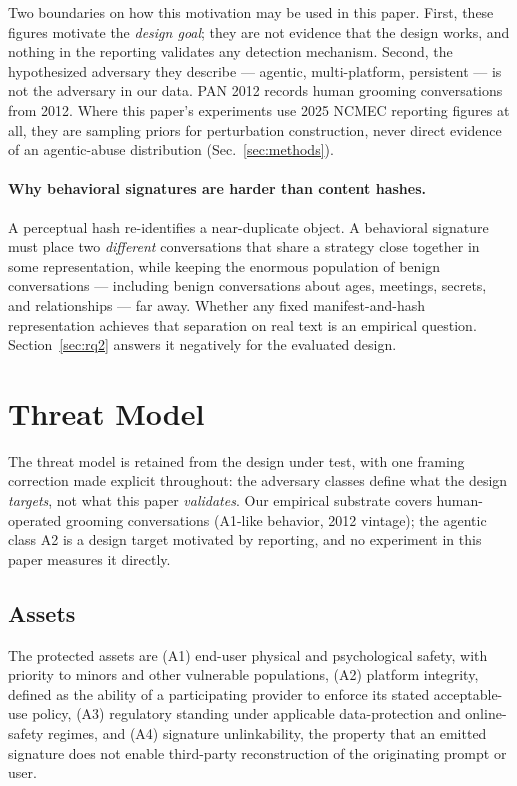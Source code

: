 \documentclass[11pt]{article}
\begin{document}
Two boundaries on how this motivation may be used in this paper. First, these figures motivate the \emph{design goal}; they are not evidence that the design works, and nothing in the reporting validates any detection mechanism. Second, the hypothesized adversary they describe --- agentic, multi-platform, persistent --- is not the adversary in our data. PAN 2012 records human grooming conversations from 2012. Where this paper's experiments use 2025 NCMEC reporting figures at all, they are sampling priors for perturbation construction, never direct evidence of an agentic-abuse distribution (Sec.~\ref{sec:methods}).

\paragraph{Why behavioral signatures are harder than content hashes.}
A perceptual hash re-identifies a near-duplicate object. A behavioral signature must place two \emph{different} conversations that share a strategy close together in some representation, while keeping the enormous population of benign conversations --- including benign conversations about ages, meetings, secrets, and relationships --- far away. Whether any fixed manifest-and-hash representation achieves that separation on real text is an empirical question. Section~\ref{sec:rq2} answers it negatively for the evaluated design.

\section{Threat Model}
\label{sec:threat}

The threat model is retained from the design under test, with one framing correction made explicit throughout: the adversary classes define what the design \emph{targets}, not what this paper \emph{validates}. Our empirical substrate covers human-operated grooming conversations (A1-like behavior, 2012 vintage); the agentic class A2 is a design target motivated by reporting, and no experiment in this paper measures it directly.

\subsection{Assets}
The protected assets are (A1) end-user physical and psychological safety, with priority to minors and other vulnerable populations, (A2) platform integrity, defined as the ability of a participating provider to enforce its stated acceptable-use policy, (A3) regulatory standing under applicable data-protection and online-safety regimes, and (A4) signature unlinkability, the property that an emitted signature does not enable third-party reconstruction of the originating prompt or user.
\end{document}
